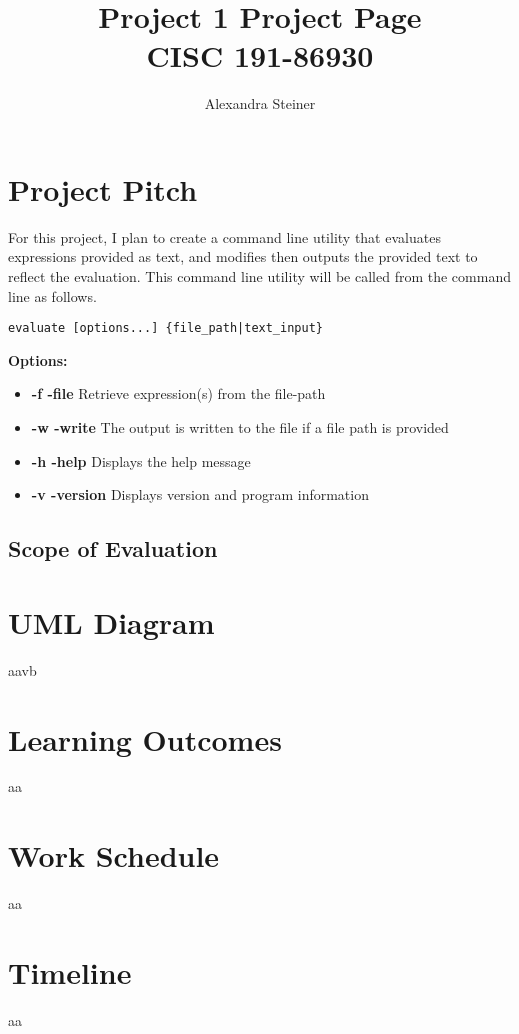 \documentclass{article}
\title{%
	Project 1 Project Page\\
    \large CISC 191-86930}
\author{Alexandra Steiner}
\begin{document}
\maketitle

\tableofcontents

\section{Project Pitch}
For this project, I plan to create a command line utility that evaluates expressions provided as text, and modifies then outputs the provided text to reflect the evaluation. This command line utility will be called from the command line as follows.

\begin{lstlisting}
evaluate [options...] {file_path|text_input}
\end{lstlisting}

\textbf{Options:}
\begin{itemize}
	\item \textbf{-f -file} Retrieve expression(s) from the file-path
	\item \textbf{-w -write} The output is written to the file if a file path is provided
	\item \textbf{-h -help} Displays the help message
	\item \textbf{-v -version} Displays version and program information
\end{itemize}

\subsection{Scope of Evaluation}

\section{UML Diagram}
aavb
\section{Learning Outcomes}
aa
\section{Work Schedule}
aa
\section{Timeline}
aa
\end{document}
